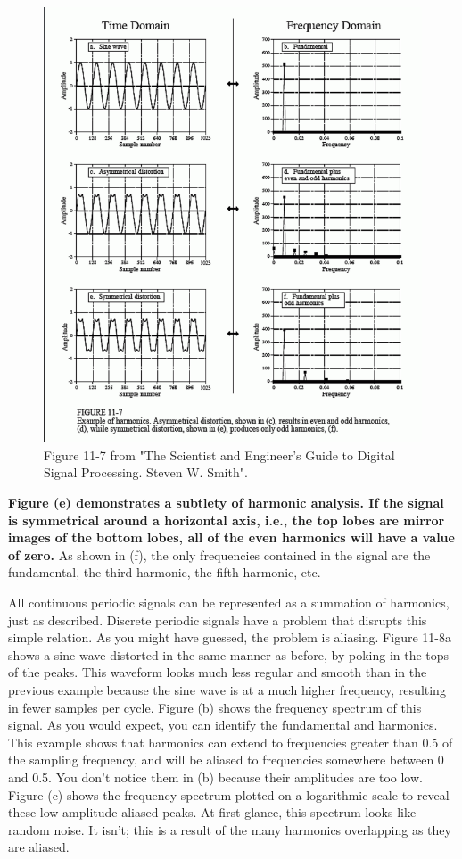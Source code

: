 \documentclass{amsart}
\theoremstyle{definition}
\begin{document}
\begin{enumerate}
\begin{figure}[h]
\centering
\includegraphics[width=.6\textwidth]{fig1.png}
\caption{\label{fig:fig}Figure 11-7 from "The Scientist and Engineer's Guide to
Digital Signal Processing. Steven W. Smith".}
\end{figure}

\textbf{Figure (e) demonstrates a subtlety of harmonic analysis. If the signal is symmetrical around a horizontal axis, i.e., the top lobes are mirror images of the bottom lobes, all of the even harmonics will have a value of zero.} As shown in (f), the only frequencies contained in the signal are the fundamental, the third harmonic, the fifth harmonic, etc.

All continuous periodic signals can be represented as a summation of harmonics, just as described. Discrete periodic signals have a problem that disrupts this simple relation. As you might have guessed, the problem is aliasing. Figure 11-8a shows a sine wave distorted in the same manner as before, by poking in the tops of the peaks. This waveform looks much less regular and smooth than in the previous example because the sine wave is at a much higher frequency, resulting in fewer samples per cycle. Figure (b) shows the frequency spectrum of this signal. As you would expect, you can identify the fundamental and harmonics. This example shows that harmonics can extend to frequencies greater than 0.5 of the sampling frequency, and will be aliased to frequencies somewhere between 0 and 0.5. You don't notice them in (b) because their amplitudes are too low. Figure (c) shows the frequency spectrum plotted on a logarithmic scale to reveal these low amplitude aliased peaks. At first glance, this spectrum looks like random noise. It isn't; this is a result of the many harmonics overlapping as they are aliased.


\end{enumerate}
\end{document}
